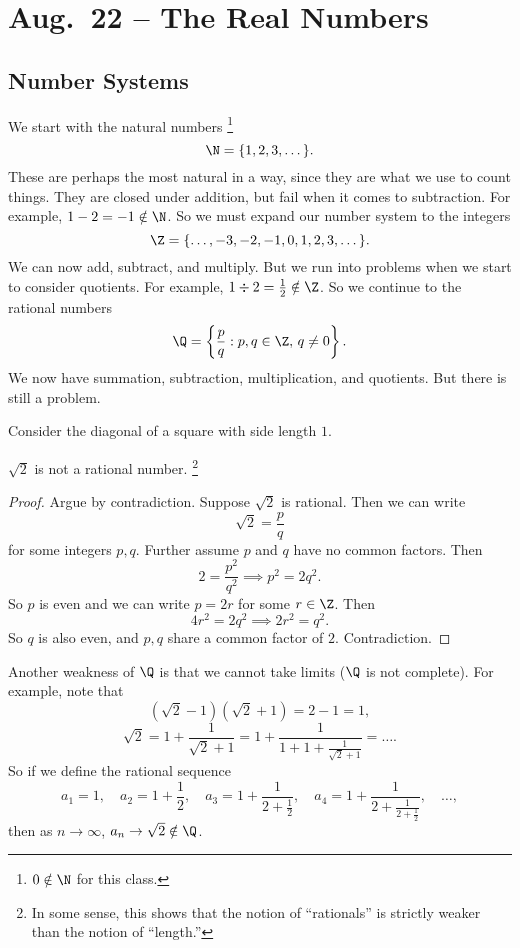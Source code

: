\chapter{Aug.~22 -- The Real Numbers}

\section{Number Systems}
We start with the natural numbers
\footnote{$0 \notin \N$ for this class.}
\[\N = \{1, 2, 3, \dots\}.\]
These are perhaps
the most natural in a way, since they are what we use to
count things. They are closed under addition, but
fail when it comes to subtraction. For example,
$1 - 2 = -1 \notin \N$.
So we must expand our number system to the
integers
\[\Z = \{\dots, -3, -2, -1, 0, 1, 2, 3, \dots\}.\]
We can now add, subtract, and
multiply. But we run into problems when we start to
consider quotients. For example,
$1 \div 2 = \frac{1}{2} \notin \Z$.
So we continue to the rational numbers
\[\Q = \left\{\frac{p}{q} : p, q \in \Z,\, q \ne 0\right\}.\]
We now have summation, subtraction,
multiplication, and quotients. But there is still a
problem.

Consider the diagonal of a square with side length $1$.

\begin{theorem}
  $\sqrt{2}$ is not a rational number. 
  \footnote{
    In some sense, this shows that the notion of
    ``rationals'' is strictly weaker than the notion of
    ``length.''
  }
\end{theorem}

\begin{proof}
  Argue by contradiction. Suppose $\sqrt{2}$ is rational.
  Then we can write
   \[
     \sqrt{2} = \frac{p}{q}
  \]
  for some integers $p, q$. Further assume $p$ and
  $q$ have no common factors. Then
  \[2 = \frac{p^2}{q^2} \implies p^2 = 2q^2.\]
  So $p$ is even and we can write $p = 2r$ for some
  $r \in \Z$. Then
  \[4r^2 = 2q^2 \implies 2r^2 = q^2.\]
  So $q$ is also even, and $p, q$ share a common factor
  of $2$. Contradiction.
\end{proof}

Another weakness of $\Q$ is that we cannot take limits
($\Q$ is not complete). For example, note that
\[(\sqrt{2} - 1)(\sqrt{2} + 1) = 2 - 1 = 1,\]
\[
  \sqrt{2} = 1 + \frac{1}{\sqrt{2} + 1}
  = 1 + \frac{1}{1 + 1 + \frac{1}{\sqrt{2} + 1}}
  = \dots
.\]
So if we define the rational sequence
\[
  a_1 = 1, \quad
  a_2 = 1 + \frac{1}{2}, \quad
  a_3 = 1 + \frac{1}{2 + \frac{1}{2}}, \quad
  a_4 = 1 + \frac{1}{2 + \frac{1}{2 + \frac{1}{2}}},
  \quad \dots
,\]
then as $n \to \infty$, $a_n \to \sqrt{2} \notin \Q$.

